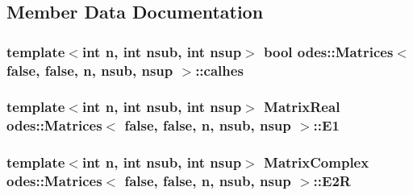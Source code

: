 \subsection{Member Data Documentation}
\hypertarget{classodes_1_1Matrices_3_01false_00_01false_00_01n_00_01nsub_00_01nsup_01_4_a5aa7e9c4b65b072c0154ad5d2a7380db}{
\subsubsection[{calhes}]{\setlength{\rightskip}{0pt plus 5cm}template$<$int n, int nsub, int nsup$>$ bool {\bf odes\-::\-Matrices}$<$ false, false, n, nsub, nsup $>$\-::calhes\hspace{0.3cm}{\ttfamily [protected]}}}\label{classodes_1_1Matrices_3_01false_00_01false_00_01n_00_01nsub_00_01nsup_01_4_a5aa7e9c4b65b072c0154ad5d2a7380db}
\hypertarget{classodes_1_1Matrices_3_01false_00_01false_00_01n_00_01nsub_00_01nsup_01_4_aa9c25553fefa37ddf1524d2b8d098b1e}{
\subsubsection[{E1}]{\setlength{\rightskip}{0pt plus 5cm}template$<$int n, int nsub, int nsup$>$ {\bf Matrix\-Real} {\bf odes\-::\-Matrices}$<$ false, false, n, nsub, nsup $>$\-::E1\hspace{0.3cm}{\ttfamily [private]}}}\label{classodes_1_1Matrices_3_01false_00_01false_00_01n_00_01nsub_00_01nsup_01_4_aa9c25553fefa37ddf1524d2b8d098b1e}
\hypertarget{classodes_1_1Matrices_3_01false_00_01false_00_01n_00_01nsub_00_01nsup_01_4_a1709aa93fc81756470531e682cb6ef16}{
\subsubsection[{E2\-R}]{\setlength{\rightskip}{0pt plus 5cm}template$<$int n, int nsub, int nsup$>$ {\bf Matrix\-Complex} {\bf odes\-::\-Matrices}$<$ false, false, n, nsub, nsup $>$\-::E2\-R\hspace{0.3cm}{\ttfamily [private]}}}\label{classodes_1_1Matrices_3_01false_00_01false_00_01n_00_01nsub_00_01nsup_01_4_a1709aa93fc81756470531e682cb6ef16}
